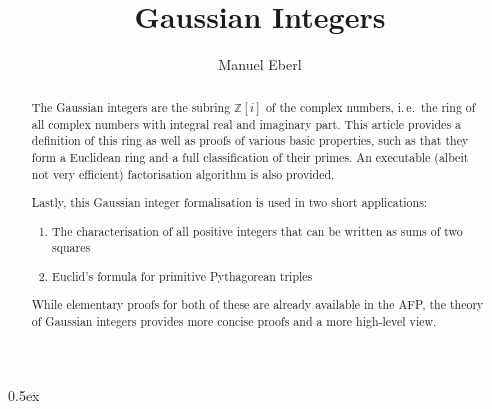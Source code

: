 \documentclass[11pt,a4paper]{article}
\begin{document}
\title{Gaussian Integers}
\author{Manuel Eberl}
\maketitle

\begin{abstract}
The Gaussian integers are the subring $\mathbb{Z}[i]$ of the complex numbers, i.\,e.\ the ring of all complex numbers with integral real and imaginary part. This article provides a definition of this ring as well as proofs of various basic properties, such as that they form a Euclidean ring and a full classification of their primes. An executable (albeit not very efficient) factorisation algorithm is also provided.

Lastly, this Gaussian integer formalisation is used in two short applications:
\begin{enumerate}
\item The characterisation of all positive integers that can be written as sums of two squares
\item Euclid's formula for primitive Pythagorean triples
\end{enumerate}
While elementary proofs for both of these are already available in the AFP, the theory of Gaussian integers provides more concise proofs and a more high-level view.
\end{abstract}

\newpage
\tableofcontents
\newpage
\parindent 0pt\parskip 0.5ex





\end{document}
